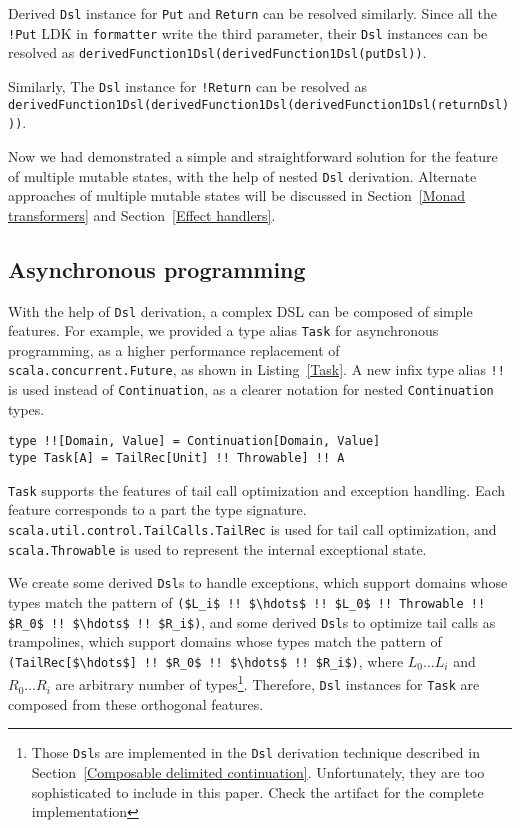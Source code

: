 Derived \lstinline{Dsl} instance for \lstinline{Put} and \lstinline{Return} can be resolved similarly. Since all the \lstinline{!Put} LDK in \lstinline{formatter} write the third parameter, their \lstinline{Dsl} instances can be resolved as \lstinline{derivedFunction1Dsl(derivedFunction1Dsl(putDsl))}.

Similarly, The \lstinline{Dsl} instance for \lstinline{!Return} can be resolved as \lstinline{derivedFunction1Dsl(derivedFunction1Dsl(derivedFunction1Dsl(returnDsl)))}.

Now we had demonstrated a simple and straightforward solution for the feature of multiple mutable states, with the help of nested \lstinline{Dsl} derivation. Alternate approaches of multiple mutable states will be discussed in Section~\ref{Monad transformers} and Section~\ref{Effect handlers}.


\subsection{Asynchronous programming}\label{Asynchronous programming}

With the help of \lstinline{Dsl} derivation, a complex DSL can be composed of simple features. For example, we provided a type alias \lstinline{Task} for asynchronous programming, as a higher performance replacement of \lstinline{scala.concurrent.Future}, as shown in Listing~\ref{Task}. A new infix type alias \lstinline{!!} is used instead of \lstinline{Continuation}, as a clearer notation for nested \lstinline{Continuation} types.
\begin{lstlisting}[caption={The definition of asynchronous \lstinline{Task}},label={Task}]
type !![Domain, Value] = Continuation[Domain, Value]
type Task[A] = TailRec[Unit] !! Throwable] !! A
\end{lstlisting}

\lstinline{Task} supports the features of tail call optimization and exception handling. Each feature corresponds to a part the type signature. \lstinline{scala.util.control.TailCalls.TailRec} is used for tail call optimization, and \lstinline{scala.Throwable} is used to represent the internal exceptional state.

We create some derived \lstinline{Dsl}s to handle exceptions, which support domains whose types match the pattern of \lstinline[mathescape=true]{($L_i$ !! $\hdots$ !! $L_0$ !! Throwable !! $R_0$ !! $\hdots$ !! $R_i$)}, and some derived \lstinline{Dsl}s to optimize tail calls as trampolines, which support domains whose types match the pattern of \lstinline[mathescape=true]{(TailRec[$\hdots$] !! $R_0$ !! $\hdots$ !! $R_i$)}, where $L_0 \hdots L_i$ and $R_0 \hdots R_i$ are arbitrary number of types\footnote{Those \lstinline{Dsl}s are implemented in the \lstinline{Dsl} derivation technique described in Section~\ref{Composable delimited continuation}. Unfortunately, they are too sophisticated to include in this paper. Check the artifact for the complete implementation}. Therefore, \lstinline{Dsl} instances for \lstinline{Task} are composed from these orthogonal features.

